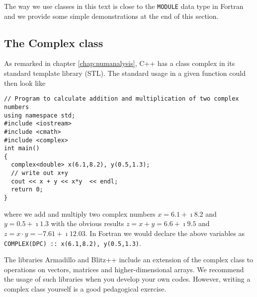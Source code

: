 The way we use classes in this text is close to the \verb?MODULE? data type in Fortran and we provide 
some simple demonstrations at the end of this section.

\subsection{The Complex class}

As remarked in chapter \ref{chap:numanalysis}, 
C++ has a class complex in its standard
template library (STL). The standard usage in a given function could then look like 
\begin{lstlisting}
// Program to calculate addition and multiplication of two complex numbers
using namespace std;
#include <iostream>
#include <cmath>
#include <complex>
int main()
{
  complex<double> x(6.1,8.2), y(0.5,1.3);
  // write out x+y
  cout << x + y << x*y  << endl;
  return 0;
}
\end{lstlisting}
where we add and multiply two complex numbers $x=6.1+\imath 8.2$ and $y=0.5+\imath 1.3$ with the obvious results
$z=x+y=6.6+\imath 9.5$ and $z=x\cdot y= -7.61+\imath 12.03$. 
In Fortran we would declare the above variables as 
\verb?COMPLEX(DPC) :: x(6.1,8.2), y(0.5,1.3)?. 

The libraries Armadillo and Blitz++ include an extension of the 
complex class to operations on vectors, matrices and higher-dimensional arrays. We recommend the usage of such libraries 
when you develop your own codes.  
However, writing  a complex  class yourself is a good pedagogical exercise.  

